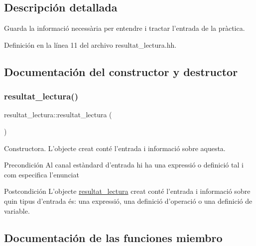 \subsection{Descripción detallada}
Guarda la informació necessària per entendre i tractar l’entrada de la pràctica. 

Definición en la línea 11 del archivo resultat\+\_\+lectura.\+hh.



\subsection{Documentación del constructor y destructor}
\hypertarget{classresultat__lectura_a73ef39653019fabadde9454451121b3f}{}\label{classresultat__lectura_a73ef39653019fabadde9454451121b3f} 
\subsubsection{\texorpdfstring{resultat\+\_\+lectura()}{resultat\_lectura()}}
{\footnotesize\ttfamily resultat\+\_\+lectura\+::resultat\+\_\+lectura (\begin{DoxyParamCaption}{ }\end{DoxyParamCaption})}



Constructora. L’objecte creat conté l’entrada i informació sobre aquesta. 

\begin{DoxyPrecond}{Precondición}
Al canal estàndard d’entrada hi ha una expressió o definició tal i com especifica l’enunciat 
\end{DoxyPrecond}
\begin{DoxyPostcond}{Postcondición}
L’objecte \hyperlink{classresultat__lectura}{resultat\+\_\+lectura} creat conté l’entrada i informació sobre quin tipus d’entrada és\+: una expressió, una definició d’operació o una definició de variable. 
\end{DoxyPostcond}


\subsection{Documentación de las funciones miembro}
\hypertarget{classresultat__lectura_a4c84ef4ddea623e7a680c639c084d11d}{}\label{classresultat__lectura_a4c84ef4ddea623e7a680c639c084d11d} 
